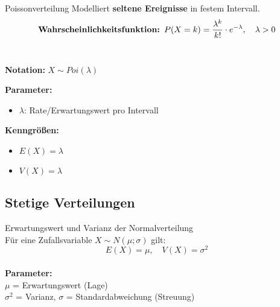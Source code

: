 \begin{definition}{Poissonverteilung}
Modelliert \textbf{seltene Ereignisse} in festem Intervall.
\vspace{-2mm}\\
$$\text{\textbf{Wahrscheinlichkeitsfunktion: }}P(X=k) = \frac{\lambda^k}{k!} \cdot e^{-\lambda}, \quad \lambda > 0$$
\vspace{-2mm}\\
\begin{minipage}[t]{0.6\textwidth}
\textbf{Notation:} $X \sim Poi(\lambda)$

\textbf{Parameter:}
\begin{itemize}
    \item $\lambda$: Rate/Erwartungswert pro Intervall
\end{itemize}
\end{minipage}
\begin{minipage}[t]{0.38\textwidth}
\textbf{Kenngrößen:}
\begin{itemize}
    \item $E(X) = \lambda$
    \item $V(X) = \lambda$
\end{itemize}
\end{minipage}
\end{definition}


\subsection{Stetige Verteilungen}

\begin{concept}{Erwartungswert und Varianz der Normalverteilung}\\
Für eine Zufallsvariable $X \sim N(\mu;\sigma)$ gilt:
\vspace{-2mm}\\
$$
E(X) = \mu, \quad V(X) = \sigma^2
$$
\vspace{-7mm}\\
\textbf{Parameter:}\\
$\mu$ = Erwartungswert (Lage)\\
$\sigma^2$ = Varianz, $\sigma$ = Standardabweichung (Streuung)
\end{concept}

